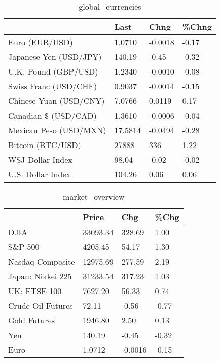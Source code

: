 \documentclass{article}%
\begin{document}
%


\begin{table}[htbp]%
\caption{global\_currencies}%
\centering%
\begin{adjustbox}{width=1\textwidth}%
\begin{tabular}{llll}
\toprule
                       &    Last &    Chng & \%Chng \\
\midrule
        Euro (EUR/USD) &  1.0710 & -0.0018 & -0.17 \\
Japanese Yen (USD/JPY) &  140.19 &   -0.45 & -0.32 \\
  U.K. Pound (GBP/USD) &  1.2340 & -0.0010 & -0.08 \\
 Swiss Franc (USD/CHF) &  0.9037 & -0.0014 & -0.15 \\
Chinese Yuan (USD/CNY) &  7.0766 &  0.0119 &  0.17 \\
  Canadian \$ (USD/CAD) &  1.3610 & -0.0006 & -0.04 \\
Mexican Peso (USD/MXN) & 17.5814 & -0.0494 & -0.28 \\
     Bitcoin (BTC/USD) &   27888 &     336 &  1.22 \\
      WSJ Dollar Index &   98.04 &   -0.02 & -0.02 \\
     U.S. Dollar Index &  104.26 &    0.06 &  0.06 \\
\bottomrule
\end{tabular}
%
\end{adjustbox}%
\end{table}

%


\begin{table}[htbp]%
\caption{market\_overview}%
\centering%
\begin{adjustbox}{width=1\textwidth}%
\begin{tabular}{llll}
\toprule
                  &    Price &     Chg &  \%Chg \\
\midrule
             DJIA & 33093.34 &  328.69 &  1.00 \\
          S\&P 500 &  4205.45 &   54.17 &  1.30 \\
 Nasdaq Composite & 12975.69 &  277.59 &  2.19 \\
Japan: Nikkei 225 & 31233.54 &  317.23 &  1.03 \\
     UK: FTSE 100 &  7627.20 &   56.33 &  0.74 \\
Crude Oil Futures &    72.11 &   -0.56 & -0.77 \\
     Gold Futures &  1946.80 &    2.50 &  0.13 \\
              Yen &   140.19 &   -0.45 & -0.32 \\
             Euro &   1.0712 & -0.0016 & -0.15 \\
\bottomrule
\end{tabular}
%
\end{adjustbox}%
\end{table}

%
\end{document}
